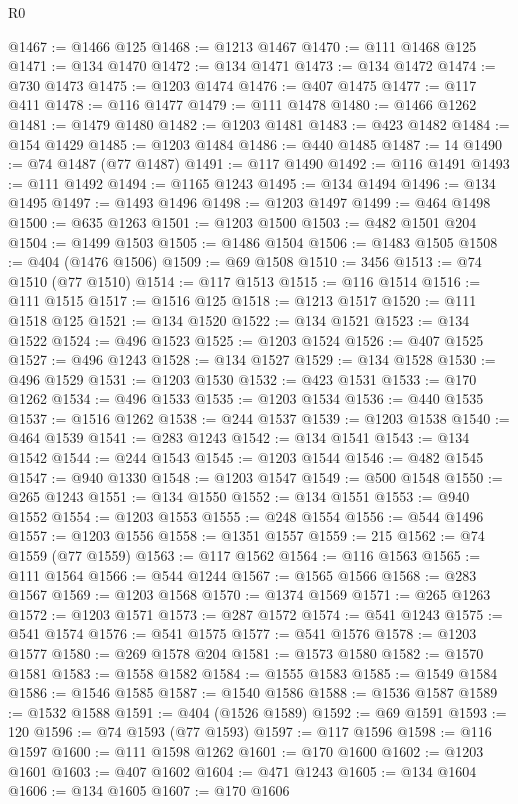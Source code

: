\begin{lexlean}{R0}
\begin{coremodule}
@1467 := @1466 @125
@1468 := @1213 @1467
@1470 := @111 @1468 @125
@1471 := @134 @1470
@1472 := @134 @1471
@1473 := @134 @1472
@1474 := @730 @1473
@1475 := @1203 @1474
@1476 := @407 @1475
@1477 := @117 @411
@1478 := @116 @1477
@1479 := @111 @1478
@1480 := @1466 @1262
@1481 := @1479 @1480
@1482 := @1203 @1481
@1483 := @423 @1482
@1484 := @154 @1429
@1485 := @1203 @1484
@1486 := @440 @1485
@1487 := 14
@1490 := @74 @1487 (@77 @1487)
@1491 := @117 @1490
@1492 := @116 @1491
@1493 := @111 @1492
@1494 := @1165 @1243
@1495 := @134 @1494
@1496 := @134 @1495
@1497 := @1493 @1496
@1498 := @1203 @1497
@1499 := @464 @1498
@1500 := @635 @1263
@1501 := @1203 @1500
@1503 := @482 @1501 @204
@1504 := @1499 @1503
@1505 := @1486 @1504
@1506 := @1483 @1505
@1508 := @404 (@1476 @1506)
@1509 := @69 @1508
@1510 := 3456
@1513 := @74 @1510 (@77 @1510)
@1514 := @117 @1513
@1515 := @116 @1514
@1516 := @111 @1515
@1517 := @1516 @125
@1518 := @1213 @1517
@1520 := @111 @1518 @125
@1521 := @134 @1520
@1522 := @134 @1521
@1523 := @134 @1522
@1524 := @496 @1523
@1525 := @1203 @1524
@1526 := @407 @1525
@1527 := @496 @1243
@1528 := @134 @1527
@1529 := @134 @1528
@1530 := @496 @1529
@1531 := @1203 @1530
@1532 := @423 @1531
@1533 := @170 @1262
@1534 := @496 @1533
@1535 := @1203 @1534
@1536 := @440 @1535
@1537 := @1516 @1262
@1538 := @244 @1537
@1539 := @1203 @1538
@1540 := @464 @1539
@1541 := @283 @1243
@1542 := @134 @1541
@1543 := @134 @1542
@1544 := @244 @1543
@1545 := @1203 @1544
@1546 := @482 @1545
@1547 := @940 @1330
@1548 := @1203 @1547
@1549 := @500 @1548
@1550 := @265 @1243
@1551 := @134 @1550
@1552 := @134 @1551
@1553 := @940 @1552
@1554 := @1203 @1553
@1555 := @248 @1554
@1556 := @544 @1496
@1557 := @1203 @1556
@1558 := @1351 @1557
@1559 := 215
@1562 := @74 @1559 (@77 @1559)
@1563 := @117 @1562
@1564 := @116 @1563
@1565 := @111 @1564
@1566 := @544 @1244
@1567 := @1565 @1566
@1568 := @283 @1567
@1569 := @1203 @1568
@1570 := @1374 @1569
@1571 := @265 @1263
@1572 := @1203 @1571
@1573 := @287 @1572
@1574 := @541 @1243
@1575 := @541 @1574
@1576 := @541 @1575
@1577 := @541 @1576
@1578 := @1203 @1577
@1580 := @269 @1578 @204
@1581 := @1573 @1580
@1582 := @1570 @1581
@1583 := @1558 @1582
@1584 := @1555 @1583
@1585 := @1549 @1584
@1586 := @1546 @1585
@1587 := @1540 @1586
@1588 := @1536 @1587
@1589 := @1532 @1588
@1591 := @404 (@1526 @1589)
@1592 := @69 @1591
@1593 := 120
@1596 := @74 @1593 (@77 @1593)
@1597 := @117 @1596
@1598 := @116 @1597
@1600 := @111 @1598 @1262
@1601 := @170 @1600
@1602 := @1203 @1601
@1603 := @407 @1602
@1604 := @471 @1243
@1605 := @134 @1604
@1606 := @134 @1605
@1607 := @170 @1606

\end{coremodule}
\end{lexlean}
